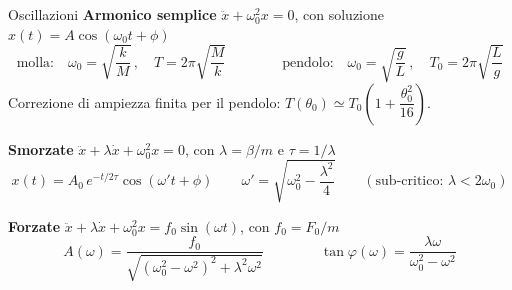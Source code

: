 \begin{formulario}{Oscillazioni}
\textbf{Armonico semplice} \quad $\ddot{x} + \omega_0^2 x = 0$, \; con soluzione $x(t) = A\cos(\omega_0 t + \phi)$
\begin{equation*}
    \text{molla:} \quad \omega_0 = \sqrt{\frac{k}{M}} \, , \quad T = 2\pi\sqrt{\frac{M}{k}}
    \qquad\qquad
    \text{pendolo:} \quad \omega_0 = \sqrt{\frac{g}{L}} \, , \quad T_0 = 2\pi\sqrt{\frac{L}{g}}
\end{equation*}
Correzione di ampiezza finita per il pendolo: $T(\theta_0) \simeq T_0\left(1 + \dfrac{\theta_0^2}{16}\right)$.

\medskip
\textbf{Smorzate} \quad $\ddot{x} + \lambda\dot{x} + \omega_0^2 x = 0$, \; con $\lambda = \beta/m$ e $\tau = 1/\lambda$
\begin{equation*}
    x(t) = A_0 \, e^{-t/2\tau} \cos(\omega' t + \phi)
    \qquad
    \omega' = \sqrt{\omega_0^2 - \frac{\lambda^2}{4}}
    \qquad (\text{sub-critico: } \lambda < 2\omega_0)
\end{equation*}

\medskip
\textbf{Forzate} \quad $\ddot{x} + \lambda\dot{x} + \omega_0^2 x = f_0 \sin(\omega t)$, \; con $f_0 = F_0/m$
\begin{equation*}
    A(\omega) = \frac{f_0}{\sqrt{(\omega_0^2 - \omega^2)^2 + \lambda^2\omega^2}}
    \qquad\qquad
    \tan\varphi(\omega) = \frac{\lambda\omega}{\omega_0^2 - \omega^2}
\end{equation*}
\end{formulario}
